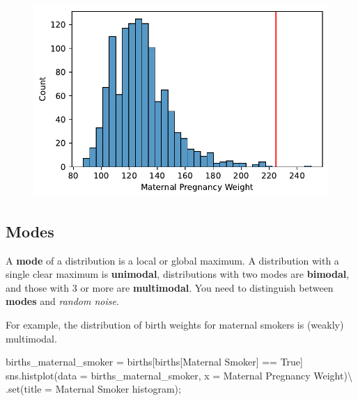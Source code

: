 \documentclass[
  letterpaper,
  DIV=11,
  numbers=noendperiod]{scrreprt}
\newenvironment{Shaded}{\begin{snugshade}}{\end{snugshade}}
\newcommand{\BuiltInTok}[1]{\textcolor[rgb]{0.00,0.23,0.31}{#1}}
\newcommand{\NormalTok}[1]{\textcolor[rgb]{0.00,0.23,0.31}{#1}}
\newcommand{\OperatorTok}[1]{\textcolor[rgb]{0.37,0.37,0.37}{#1}}
\newcommand{\StringTok}[1]{\textcolor[rgb]{0.13,0.47,0.30}{#1}}
\newcommand{\VariableTok}[1]{\textcolor[rgb]{0.07,0.07,0.07}{#1}}
\begin{document}
\begin{figure}[H]

{\centering \includegraphics{visualization_1/visualization_1_files/figure-pdf/cell-12-output-1.pdf}

}

\end{figure}

\hypertarget{modes}{%
\subsection{Modes}\label{modes}}

A \textbf{mode} of a distribution is a local or global maximum. A
distribution with a single clear maximum is \textbf{unimodal},
distributions with two modes are \textbf{bimodal}, and those with 3 or
more are \textbf{multimodal}. You need to distinguish between
\textbf{modes} and \emph{random noise}.

For example, the distribution of birth weights for maternal smokers is
(weakly) multimodal.

\begin{Shaded}
\begin{Highlighting}[]
\NormalTok{births\_maternal\_smoker }\OperatorTok{=}\NormalTok{ births[births[}\StringTok{\textquotesingle{}Maternal Smoker\textquotesingle{}}\NormalTok{] }\OperatorTok{==} \VariableTok{True}\NormalTok{]}
\NormalTok{sns.histplot(data }\OperatorTok{=}\NormalTok{ births\_maternal\_smoker, x }\OperatorTok{=} \StringTok{\textquotesingle{}Maternal Pregnancy Weight\textquotesingle{}}\NormalTok{)}\OperatorTok{\textbackslash{}}
\NormalTok{            .}\BuiltInTok{set}\NormalTok{(title }\OperatorTok{=} \StringTok{\textquotesingle{}Maternal Smoker histogram\textquotesingle{}}\NormalTok{)}\OperatorTok{;}
\end{Highlighting}
\end{Shaded}
\end{document}
